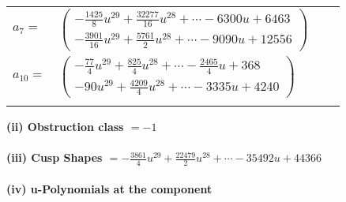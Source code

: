 \documentclass[1p]{elsarticle_modified}
\theoremstyle{definition}
\begin{document}
\begin{tabular}{m{7pt} m{180pt} m{7pt} m{180pt} }
\flushright $a_{7}=$&$\begin{pmatrix}-\frac{1425}{8} u^{29}+\frac{32277}{16} u^{28}+\cdots-6300 u+6463\\-\frac{3901}{16} u^{29}+\frac{5761}{2} u^{28}+\cdots-9090 u+12556\end{pmatrix}$ \\
\flushright $a_{10}=$&$\begin{pmatrix}-\frac{77}{4} u^{29}+\frac{825}{4} u^{28}+\cdots-\frac{2465}{4} u+368\\-90 u^{29}+\frac{4209}{4} u^{28}+\cdots-3335 u+4240\end{pmatrix}$\\&\end{tabular}
\flushleft \textbf{(ii) Obstruction class $= -1$}\\~\\
\flushleft \textbf{(iii) Cusp Shapes $= -\frac{3861}{4} u^{29}+\frac{22479}{2} u^{28}+\cdots-35492 u+44366$}\\~\\
\newpage\renewcommand{\arraystretch}{1}
\flushleft \textbf{(iv) u-Polynomials at the component}\newline \\
\end{document}
